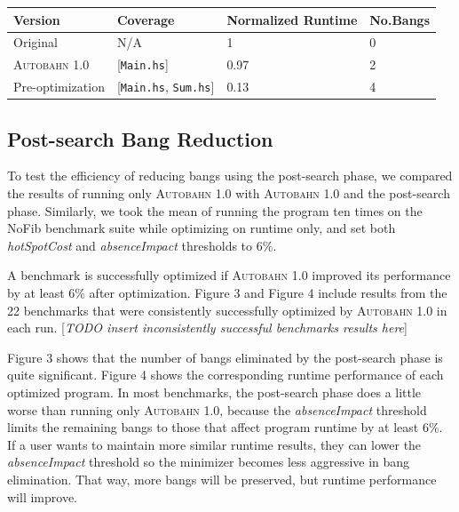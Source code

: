 \documentclass[format=sigplan, review=true]{acmart}
\newcommand{\hotspotcost}[0]{\textit{hotSpotCost}}
\newcommand{\Ao}[0]{\textsc{Autobahn 1.0}}
\newcommand{\postopt}[0]{post-search}
\newcommand{\Postopt}[0]{Post-search}
\newcommand{\absim}[0]{\textit{absenceImpact}}
\begin{document}
\begin{tabular}{p{2.5cm}p{1.5cm}p{2cm}p{1cm}}
\hline
Version   & Coverage & Normalized Runtime & No.Bangs \\
\hline
Original      & N/A   &   1	 & 0   \\
\Ao{}       & [\texttt{Main.hs}]      & 0.97    &  2\\
Pre-optimization	& [\texttt{Main.hs}, \texttt{Sum.hs}]         & 0.13      & 4\\
\hline
\end{tabular}


\subsection{\Postopt{} Bang Reduction}

To test the efficiency of reducing bangs using the \postopt{} phase, we compared the results of running only \Ao{} with \Ao{} and the \postopt{} phase. Similarly, we took the mean of running the program ten times on the NoFib benchmark suite while optimizing on runtime only, and set both \hotspotcost{} and \absim{} thresholds to 6\%. 


A benchmark is successfully optimized if \Ao{} improved its performance by at least 6\% after optimization. Figure 3 and Figure 4 include results from the 22 benchmarks that were consistently successfully optimized by \Ao{} in each run. [\textit{TODO insert inconsistently successful benchmarks results here}]

Figure 3 shows that the number of bangs eliminated by the \postopt{} phase is quite significant. Figure 4 shows the corresponding runtime performance of each optimized program. In most benchmarks, the \postopt{} phase does a little worse than running only \Ao{}, because the \absim{} threshold limits the remaining bangs to those that affect program runtime by at least 6\%. If a user wants to maintain more similar runtime results, they can lower the \absim{} threshold so the minimizer becomes less aggressive in bang elimination. That way, more bangs will be preserved, but runtime performance will improve. 
\end{document}
